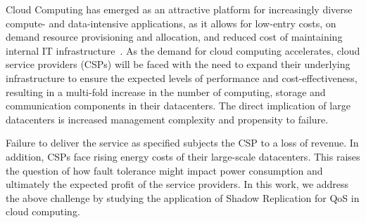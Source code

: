 Cloud Computing has emerged as an attractive platform for increasingly
diverse compute- and data-intensive applications, as it allows for
low-entry costs, on demand resource provisioning and allocation, and
reduced cost of maintaining internal IT
infrastructure~\cite{tchana_cits_2012}. %
As the demand for cloud computing
accelerates, cloud service providers (CSPs) will be faced with the
need to expand their underlying infrastructure to ensure the expected
levels of performance and cost-effectiveness, resulting
in a multi-fold increase in the number of computing, storage and
communication components in their datacenters. The direct implication of large datacenters is increased management complexity and propensity to
failure.

Failure to deliver
the service as specified subjects the CSP to a loss of revenue. In addition, CSPs face rising energy costs of their large-scale
datacenters. This raises the question of how
fault tolerance might impact power consumption and ultimately the
expected profit of the service providers. In this work, we address the above challenge 
by studying the application of Shadow Replication for QoS in cloud computing.

%
%
%

